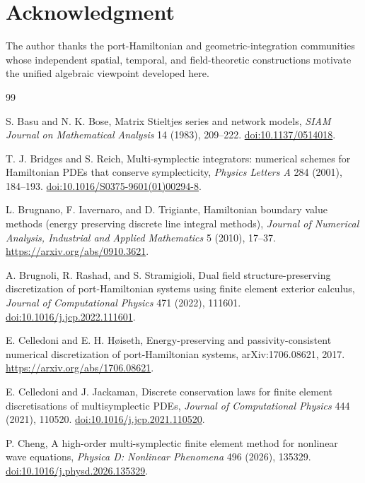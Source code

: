 \documentclass[11pt,a4paper]{article}
\begin{document}
\section*{Acknowledgment}
The author thanks the port-Hamiltonian and geometric-integration communities
whose independent spatial, temporal, and field-theoretic constructions
motivate the unified algebraic viewpoint developed here.

\begin{thebibliography}{99}

S. Basu and N. K. Bose,
\newblock Matrix Stieltjes series and network models,
\newblock \emph{SIAM Journal on Mathematical Analysis} 14 (1983),
209--222.
\newblock \href{https://doi.org/10.1137/0514018}
{doi:10.1137/0514018}.

T. J. Bridges and S. Reich,
\newblock Multi-symplectic integrators: numerical schemes for Hamiltonian
PDEs that conserve symplecticity,
\newblock \emph{Physics Letters A} 284 (2001), 184--193.
\newblock \href{https://doi.org/10.1016/S0375-9601(01)00294-8}
{doi:10.1016/S0375-9601(01)00294-8}.

L. Brugnano, F. Iavernaro, and D. Trigiante,
\newblock Hamiltonian boundary value methods (energy preserving discrete
line integral methods),
\newblock \emph{Journal of Numerical Analysis, Industrial and Applied
Mathematics} 5 (2010), 17--37.
\newblock \url{https://arxiv.org/abs/0910.3621}.

A. Brugnoli, R. Rashad, and S. Stramigioli,
\newblock Dual field structure-preserving discretization of
port-Hamiltonian systems using finite element exterior calculus,
\newblock \emph{Journal of Computational Physics} 471 (2022), 111601.
\newblock \href{https://doi.org/10.1016/j.jcp.2022.111601}
{doi:10.1016/j.jcp.2022.111601}.

E. Celledoni and E. H. H{\o}iseth,
\newblock Energy-preserving and passivity-consistent numerical
discretization of port-Hamiltonian systems,
\newblock arXiv:1706.08621, 2017.
\newblock \url{https://arxiv.org/abs/1706.08621}.

E. Celledoni and J. Jackaman,
\newblock Discrete conservation laws for finite element discretisations of
multisymplectic PDEs,
\newblock \emph{Journal of Computational Physics} 444 (2021), 110520.
\newblock \href{https://doi.org/10.1016/j.jcp.2021.110520}
{doi:10.1016/j.jcp.2021.110520}.

P. Cheng,
\newblock A high-order multi-symplectic finite element method for nonlinear
wave equations,
\newblock \emph{Physica D: Nonlinear Phenomena} 496 (2026), 135329.
\newblock \href{https://doi.org/10.1016/j.physd.2026.135329}
{doi:10.1016/j.physd.2026.135329}.


\end{thebibliography}
\end{document}
